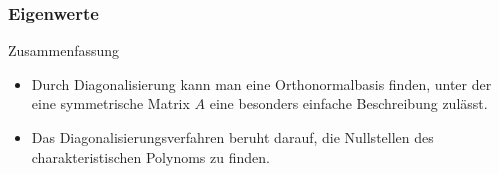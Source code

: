 \documentclass{beamer}
\renewcommand{\ae}{\"a}
\newcommand{\mytitle}{Eigenwerte}
\begin{document}
\begin{frame}\frametitle{\mytitle}
	\begin{block}{Zusammenfassung}
	\begin{itemize}
		\item Durch Diagonalisierung kann man eine Orthonormalbasis finden, unter der eine symmetrische Matrix $A$ eine besonders einfache Beschreibung zul\ae sst.
		\item Das Diagonalisierungsverfahren beruht darauf, die Nullstellen des charakteristischen Polynoms zu finden.
	\end{itemize}	
	\end{block}
\end{frame}
\end{document}
